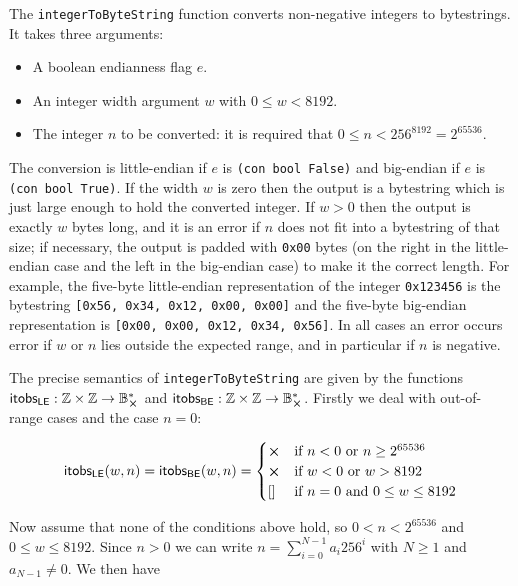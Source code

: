 \label{note:itobs}
The \texttt{integerToByteString} function converts non-negative integers to bytestrings.
It takes three arguments:
\begin{itemize}
\item A boolean endianness flag $e$.
\item An integer width argument $w$ with $0 \leq w < 8192$.
\item The integer $n$ to be converted: it is required that $0 \leq n < 256^{8192} = 2^{65536}$.
\end{itemize}

\noindent The conversion is little-endian if $e$ is \texttt{(con bool False)} and
big-endian if $e$ is \texttt{(con bool True)}. If the width $w$ is zero then the
output is a bytestring which is just large enough to hold the converted integer.
If $w>0$ then the output is exactly $w$ bytes long, and it is an error if $n$
does not fit into a bytestring of that size; if necessary, the output is padded
with \texttt{0x00} bytes (on the right in the little-endian case and the left in
the big-endian case) to make it the correct length.  For example, the five-byte
little-endian representation of the integer \texttt{0x123456} is the
bytestring \texttt{[0x56, 0x34, 0x12, 0x00, 0x00]} and the five-byte big-endian
representation is \texttt{[0x00, 0x00, 0x12, 0x34, 0x56]}.  In all cases an
error occurs error if $w$ or $n$ lies outside the expected range, and in
particular if $n$ is negative.

\newpage
\noindent The precise semantics of \texttt{integerToByteString} are given
by the functions $\itobsLE: \Z \times \Z \rightarrow \withError{\B^*}$ and $\itobsBE
: \Z \times \Z \rightarrow \withError{\B^*}$.  Firstly we deal with out-of-range cases and
the case $n=0$:

$$
\itobsLE (w,n) = \itobsBE (w,n) = 
\begin{cases}
  \errorX & \text{if $n<0$ or $n \geq 2^{65536}$}\\
  \errorX & \text{if $w<0$ or $w > 8192$}\\
  [] & \text{if $n=0$ and $0 \leq w \leq 8192$}\\
\end{cases}
$$

\noindent  Now assume that none of the conditions above hold, so $0 < n < 2^{65536}$ and
$0 \leq w \leq 8192$.  Since $n>0$ we can write
$n = \sum_{i=0}^{N-1}a_{i}256^i$ with $N \geq 1$ and $a_{N-1} \ne 0$.   We then  have

